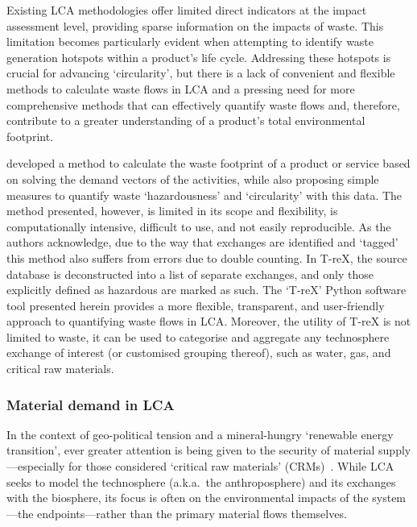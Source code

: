 \documentclass[a4paper,fleqn]{cas-dc}
\begin{document}
Existing LCA methodologies offer limited direct indicators at the impact assessment level, providing sparse information on the impacts of waste. This limitation becomes particularly evident when attempting to identify waste generation hotspots within a product's life cycle. Addressing these hotspots is crucial for advancing `circularity', but there is a lack of convenient and flexible methods to calculate waste flows in LCA and a pressing need for more comprehensive methods that can effectively quantify waste flows and, therefore, contribute to a greater understanding of a product's total environmental footprint.

\cite{laurenti2023wastefootprint} developed a method to calculate the waste footprint of a product or service based on solving the demand vectors of the activities, while also proposing simple measures to quantify waste `hazardousness' and `circularity' with this data. The method presented, however, is limited in its scope and flexibility, is computationally intensive, difficult to use, and not easily reproducible. As the authors acknowledge, due to the way that exchanges are identified and `tagged' this method also suffers from errors due to double counting.  In T-reX, the source database is deconstructed into a list of separate exchanges, and only those explicitly defined as hazardous are marked as such. The `T-reX' Python software tool presented herein provides a more flexible, transparent, and user-friendly approach to quantifying waste flows in LCA\@. Moreover, the utility of T-reX is not limited to waste, it can be used to categorise and aggregate any technosphere exchange of interest (or customised grouping thereof), such as water, gas, and critical raw materials.

\subsubsection{Material demand in LCA}\label{sec:intro-material}

In the context of geo-political tension and a mineral-hungry `renewable energy transition', ever greater attention is being given to the security of material supply---especially for those considered `critical raw materials' (CRMs)~\citep{eu2023crmstudy,hool2023crm,mancini2013supplysecurity,jrc2023supplychain,hartley2024cepolitics,salviulo2021supplychain,iea2023crm,iea2023energytechperspectives}. While LCA seeks to model the technosphere (a.k.a.\ the anthroposphere) and its exchanges with the biosphere, its focus is often on the environmental impacts of the system---the endpoints---rather than the primary material flows themselves.
\end{document}
